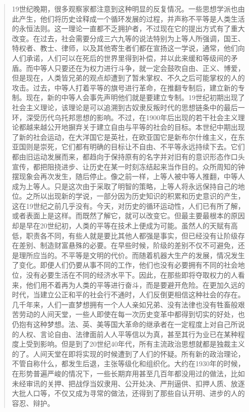 \begin{paracol}{2}
\begin{quotation}
\switchcolumn

19世纪晚期，很多观察家都注意到这种明显的反复情况。一些思想学派也由此产生，他们将历史诠释成一个循环发展的过程，并声称不平等是人类生活的永恒法则。这一理论一直都不乏拥护者，不过现在它的提出方式有了重大改变。在过去，社会需要分成三六九等的说法特别为上等人所强调，国王、特权者、教士、律师，以及其他寄生者们都在宣扬这一学说，通常，他们向人们承诺，人们可以在死后的世界里得到补偿，并以此来缓和等级间的矛盾。而中等人只要还在为权力进行斗争，就一定会鼓吹自由、正义、博爱，但是现在，人类皆兄弟的观点却遭到了暂未掌权、不久之后可能掌权的人的攻击。过去，中等人打着平等的旗号进行革命，在推翻专制后，建立新的专制。现在，新的中等人会事先声明他们就是要建立专制。19世纪初期出现了社会主义理论，该理论是可以追溯到古奴隶反叛时代的思想链条中的最后一环，深受历代乌托邦思想的影响。不过，在1900年后出现的若干社会主义理论都越来越公开地摒弃关于建立自由与平等的社会的目标。本世纪中期出现了新的社会运动，在大洋国它是英社，在欧亚国它是新布尔什维主义，在东亚国则是崇死，它们都有明确的目标让不自由、不平等永远持续下去。它们都由旧运动发展而来，都趋向于保持原有的名字并对旧有的意识形态作口头宣传，都把阻挠进步、让历史在某一时刻冻结起来当作目的。众所周知的钟摆现象会再次发生，随后停止。像之前一样，上等人被中等人推翻，中等人成为上等人。只是这次由于采取了明智的策略，上等人将永远保持自己的地位。之所以出现新的学说，一部分因为历史知识的积累和历史意识的产生，这在19世纪之前几乎没有。今天，对历史的循环运动性，人们已有所了解，或者表面上是这样。而既然了解它，就可以改变它。但最主要最根本的原因却是早在20世纪初，人类的平等在技术上便成为可能。虽然人的天赋有高低，职责各不同，有些人就是要比其他人都强是事实，但已经没有让阶级存在差别、制造财富悬殊的必要。在早些时候，阶级的差别不仅不可避免，还是理所应当的。不平等是文明的代价。而随着机器大生产的发展，情况发生了变化。即便人们仍要从事不同的工作，他们也没有必要拥有不同的社会地位，没有必要生活在不同的经济水平下。因此，在那些即将夺取权力的人看来，他们用不着再为人类的平等进行奋斗，而是要避开危险。在更加久远的时代，当建立公正和平的社会行不通时，人们反倒更相信这种社会的存在。几千年来，人们一直梦想拥有一个人人亲如兄弟、没有法律也没有牲畜般艰苦劳动的人间天堂，一些人即使在每一次历史变革中都得到切实的好处，也仍抱有这种梦想。法、英、美等国大革命的继承者在一定程度上对自己所说的人权、言论自由、法律面前人人平等信以为真，甚至其行为业已在某种程度上受到影响。但是到了20世纪40年代，所有主流政治思想就都是独裁主义的了。人间天堂在即将实现的时候遭到了人们的怀疑。所有新的政治理论，不管自称什么，都发生后退，主张等级化和组织化。大约在1930年的时候，在形势普遍严峻的情况下，一些长期弃用甚至几百年都没用过的做法，比如未经审讯的关押、把战俘当奴隶用、公开处决、严刑逼供、扣押人质、放逐大批人口等，不仅又成为寻常的做法，还得到了那些自认开明、进步的人的容忍、辩护。


\end{quotation}
\end{paracol}
